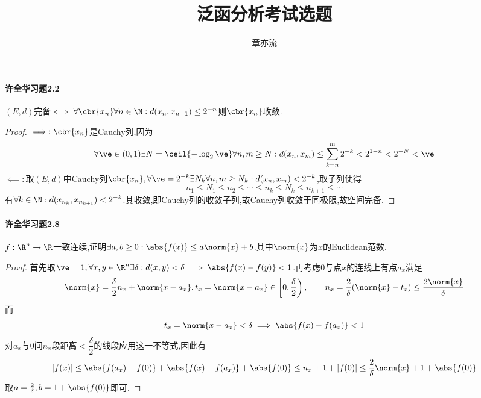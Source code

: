 \documentclass{article}
\title{泛函分析考试选题}
\author{章亦流}
\begin{document}
\maketitle

\paragraph{许全华习题2.2}$(E,d)$完备$\iff \forall\cbr{x_n}\forall n\in \N:d(x_n,x_{n+1})\leq 2^{-n}$则$\cbr{x_n}$收敛.
\begin{proof}
    $\implies:\cbr{x_n}$是Cauchy列,因为$$\forall \ve\in (0,1) \exists N=\ceil{-\log_2 \ve}\forall n,m\geq N: d(x_n,x_m)\leq \sum_{k=n}^m 2^{-k}< 2^{1-n}<2^{-N}<\ve$$
    $\impliedby:$取$(E,d)$中Cauchy列$\cbr{x_n},\forall \ve=2^{-k}\exists N_k\forall n,m\geq N_k:d(x_n,x_m)<2^{-k}$,取子列使得$$n_1\leq N_1\leq n_2\leq \cdots \leq n_k\leq N_k\leq n_{k+1}\leq \cdots$$
    有$\forall k\in \N:d(x_{n_k},x_{n_{k+1}})<2^{-k}$.其收敛,即Cauchy列的收敛子列,故Cauchy列收敛于同极限,故空间完备.
\end{proof}

\paragraph{许全华习题2.8}$f:\R^n\to \R$一致连续,证明$\exists a,b\geq 0:\abs{f(x)}\leq a\norm{x}+b$.其中$\norm{x}$为$x$的Euclidean范数.
\begin{proof}
    首先取$\ve=1,\forall x,y\in \R^n \exists \delta:d(x,y)<\delta\implies \abs{f(x)-f(y)}<1$.再考虑0与点$x$的连线上有点$a_x$满足$$\norm{x}=\frac{\delta}{2}n_x+\norm{x-a_x}, t_x=\norm{x-a_x}\in \left[0,\frac{\delta}{2}\right),\qquad n_x=\frac{2}{\delta}(\norm{x}-t_x)\leq \frac{2\norm{x}}{\delta}$$
    而$$t_x=\norm{x-a_x}<\delta\implies \abs{f(x)-f(a_x)}<1$$
    对$a_x$与0间$n_x$段距离$<\dfrac{\delta}{2}$的线段应用这一不等式,因此有$$|f(x)|\leq \abs{f(a_x)-f(0)}+\abs{f(x)-f(a_x)}+\abs{f(0)}\leq n_x+1+|f(0)|\leq \frac{2}{\delta}\norm{x}+1+\abs{f(0)}$$
    取$ a=\frac{2}{\delta},b=1+\abs{f(0)}$即可.
\end{proof}
\end{document}
